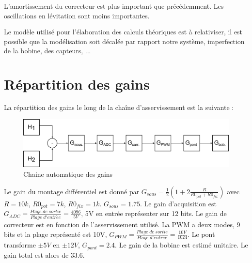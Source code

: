 \documentclass[11pt, french]{article} %
\begin{document}
L'amortissement du correcteur est plus important que précédemment. Les oscillations en lévitation sont moins importantes.

Le modèle utilisé pour l'élaboration des calculs théoriques est à relativiser, il est possible que la modélisation soit décalée par rapport notre système, imperfection de la bobine, des capteurs, ...

%
%
%
%
%
%


\section{Répartition des gains}
La répartition des gains le long de la chaîne d'asservissement est la suivante :
\begin{figure}[h!]
	\centering
	\includegraphics[width = 16cm]{SolutionNumerique/Gain.png} 
	\caption{Chaine automatique des gains}
\end{figure}

Le gain du montage différentiel est donné par $G_{sous}=\frac{1}{2}\left( 1+2 \frac{R}{R0_{pot}+R0_{fix}}\right)$ avec $R=10k$, $R0_{pot}=7k$, $R0_{fix}=1k$. $G_{sous}=1.75$.
Le gain d'acquisition est $G_{ADC}= \frac{Plage \; de \; sortie}{Plage \; d'entr \acute{e} e}=\frac{4096}{5V}$, 5V en entrée représenter sur 12 bits. 
Le gain de correcteur est en fonction de l'asservissement utilisé.
La PWM a deux modes, 9 bits et la plage représenté est 10V, $G_{PWM}= \frac{Plage \; de \; sortie}{Plage \; d'entr \acute{e} e}=\frac{10V}{1024}$.
Le pont transforme $\pm5V$ en $\pm12V$, $G_{pont}=2.4$.
Le gain de la bobine est estimé unitaire. Le gain total est alors de $33.6$.
\end{document}

